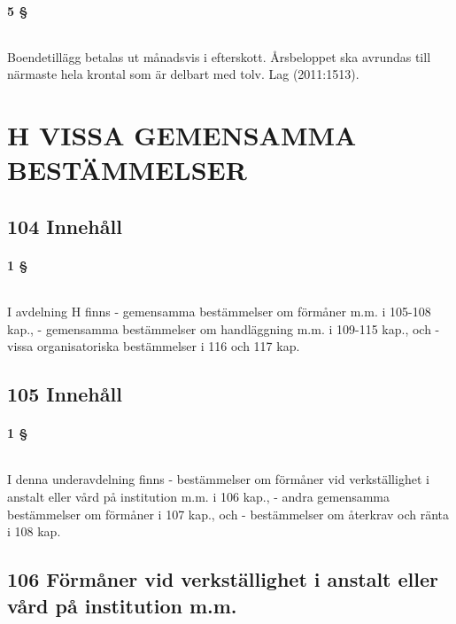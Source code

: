 \documentclass[a4paper,notitlepage,openany,10pt]{book}
\begin{document}
\subsection*{5 §}
\paragraph*{}
Boendetillägg betalas ut månadsvis i efterskott.
Årsbeloppet ska avrundas till närmaste hela krontal som är delbart med tolv.
Lag (2011:1513).
\part*{H VISSA GEMENSAMMA BESTÄMMELSER}
\chapter*{104 Innehåll}
\subsection*{1 §}
\paragraph*{}
I avdelning H finns
\newline - gemensamma bestämmelser om förmåner m.m. i 105-108 kap.,
\newline - gemensamma bestämmelser om handläggning m.m. i 109-115 kap., och
\newline - vissa organisatoriska bestämmelser i 116 och 117 kap.
\chapter*{105 Innehåll}
\subsection*{1 §}
\paragraph*{}
I denna underavdelning finns
\newline - bestämmelser om förmåner vid verkställighet i anstalt eller vård på institution m.m. i 106 kap.,
\newline - andra gemensamma bestämmelser om förmåner i 107 kap., och
\newline - bestämmelser om återkrav och ränta i 108 kap.
\chapter*{106 Förmåner vid verkställighet i anstalt eller vård på institution m.m.}
\end{document}
